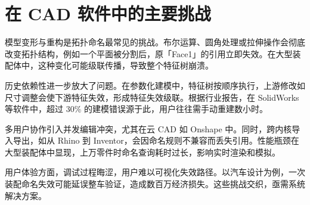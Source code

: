 \chapter{在 CAD 软件中的主要挑战}
模型变形与重构是拓扑命名最常见的挑战。布尔运算、圆角处理或拉伸操作会彻底改变拓扑结构，例如一个平面被分割后，原「Face1」的引用立即失效。在大型装配体中，这种变化可能级联传播，导致整个特征树崩溃。\par
历史依赖性进一步放大了问题。在参数化建模中，特征树按顺序执行，上游修改如尺寸调整会使下游特征失效，形成特征失效级联。根据行业报告，在 SolidWorks 等软件中，超过 30\%{} 的建模错误源于此，用户往往需手动重建数小时。\par
多用户协作引入并发编辑冲突，尤其在云 CAD 如 Onshape 中。同时，跨内核导入导出，如从 Rhino 到 Inventor，会因命名规则不兼容而丢失引用。性能瓶颈在大型装配体中显现，上万零件时命名查询耗时过长，影响实时渲染和模拟。\par
用户体验方面，调试过程晦涩，用户难以可视化失效路径。以汽车设计为例，一次装配命名失效可能延误整车验证，造成数百万经济损失。这些挑战交织，亟需系统解决方案。\par
